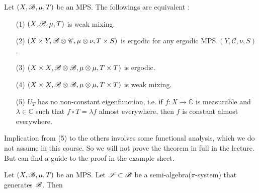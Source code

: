 \documentclass[10pt,a4paper]{report}
\begin{document}
\thm Let $(X,\mathscr{B}, \mu, T)$ be an MPS. The followings are equivalent :
\begin{itemize}
\item[(1)] $(X,\mathscr{B}, \mu, T)$ is weak mixing.
\item[(2)] $(X\times Y,\mathscr{B}\otimes \mathscr{C}, \mu\otimes \nu, T\times S)$ is ergodic for any ergodic MPS $(Y,\mathscr{C},\nu, S)$. 
\item[(3)] $(X\times X,\mathscr{B}\otimes \mathscr{B}, \mu\otimes \mu, T\times T)$ is ergodic.
\item[(4)] $(X\times X,\mathscr{B}\otimes \mathscr{B}, \mu\otimes \mu, T\times T)$ is weak mixing.
\item[(5)] $U_T$ has no non-constant eigenfunction, i.e. if $f:X\rightarrow \mathbb{C}$ is measurable and $\lambda \in \mathbb{C}$ such that $f\circ T = \lambda f$ almost everywhere, then $f$ is constant almost everywhere. 
\end{itemize}
\s

Implication from (5) to the others involves some functional analysis, which we do not assume in this course. So we will not prove the theorem in full in the lecture. But can find a guide to the proof in the example sheet.
\s

\lem Let $(X,\mathscr{B}, \mu, T)$ be an MPS. Let $\mathscr{S} \subset \mathscr{B}$ be a semi-algebra($\pi$-system) that generates $\mathscr{B}$. Then
\end{document}
